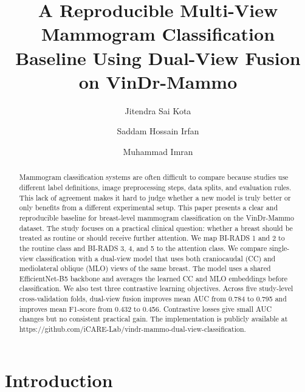 \documentclass[runningheads]{llncs}
\begin{document}
\title{A Reproducible Multi-View Mammogram Classification Baseline Using Dual-View Fusion on VinDr-Mammo}


\author{Jitendra Sai Kota \and
Saddam Hossain Irfan \and
Muhammad Imran}



\maketitle

\begin{abstract}
Mammogram classification systems are often difficult to compare because studies use different label definitions, image preprocessing steps, data splits, and evaluation rules. This lack of agreement makes it hard to judge whether a new model is truly better or only benefits from a different experimental setup. This paper presents a clear and reproducible baseline for breast-level mammogram classification on the VinDr-Mammo dataset. The study focuses on a practical clinical question: whether a breast should be treated as routine or should receive further attention. We map BI-RADS 1 and 2 to the routine class and BI-RADS 3, 4, and 5 to the attention class. We compare single-view classification with a dual-view model that uses both craniocaudal (CC) and mediolateral oblique (MLO) views of the same breast. The model uses a shared EfficientNet-B5 backbone and averages the learned CC and MLO embeddings before classification. We also test three contrastive learning objectives. Across five study-level cross-validation folds, dual-view fusion improves mean AUC from 0.784 to 0.795 and improves mean F1-score from 0.432 to 0.456. Contrastive losses give small AUC changes but no consistent practical gain. The implementation is publicly available at https://github.com/iCARE-Lab/vindr-mammo-dual-view-classification.

\end{abstract}

\section{Introduction}
\label{sec:introduction}
\end{document}
